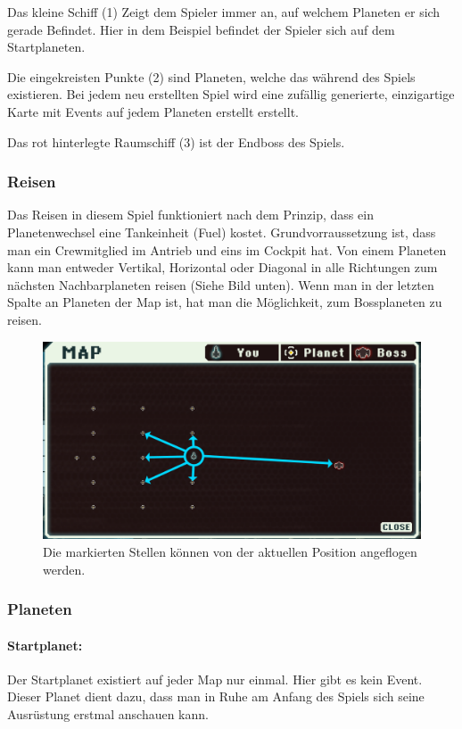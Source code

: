 \documentclass[fontsize=12pt,paper=a4,twoside]{scrartcl}
\begin{document}
Das kleine Schiff (1) Zeigt dem Spieler immer an, auf welchem Planeten er sich gerade Befindet. Hier in dem Beispiel befindet der Spieler sich auf dem Startplaneten. 

Die eingekreisten Punkte (2) sind Planeten, welche das während des Spiels existieren. Bei jedem neu erstellten Spiel wird eine zufällig generierte, einzigartige Karte mit Events auf jedem Planeten erstellt erstellt. 

Das rot hinterlegte Raumschiff (3) ist der Endboss des Spiels. 

\subsubsection{Reisen} 

Das Reisen in diesem Spiel funktioniert nach dem Prinzip, dass ein Planetenwechsel eine Tankeinheit (Fuel) kostet. Grundvorraussetzung ist, dass man ein Crewmitglied im Antrieb und eins im Cockpit hat. Von einem Planeten kann man entweder Vertikal, Horizontal oder Diagonal in alle Richtungen zum nächsten Nachbarplaneten reisen (Siehe Bild unten). Wenn man in der letzten Spalte an Planeten der Map ist, hat man die Möglichkeit, zum Bossplaneten zu reisen.

\begin{figure}[H]
\centering
\includegraphics[width=0.8\linewidth]{DasSpiel/Karte/wohinReisen.png}
\caption{Die markierten Stellen können von der aktuellen Position angeflogen werden.}
\end{figure} 




\subsubsection{Planeten}

\paragraph{Startplanet: }
Der Startplanet existiert auf jeder Map nur einmal. Hier gibt es kein Event. Dieser Planet dient dazu, dass man in Ruhe am Anfang des Spiels sich seine Ausrüstung erstmal anschauen kann. 
\end{document}
